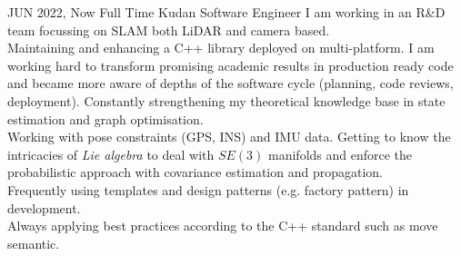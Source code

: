 \documentclass[
	12pt, %
]{../templates/FreemanCV}
\begin{document}
\jobentry
	{JUN 2022, Now} %
	{Full Time} %
  {Kudan} %
	{Software Engineer} %
	{
    I am working in an R\&D team focussing on SLAM both LiDAR and camera based.\\
    Maintaining and enhancing a C++ library deployed on multi-platform.
    I am working hard to transform promising academic results in production ready code
    and became more aware of depths of the software cycle (planning, code reviews, deployment).
    Constantly strengthening my theoretical knowledge base in state estimation and graph optimisation.\\
    Working with pose constraints (GPS, INS) and IMU data.
    Getting to know the intricacies of \textit{Lie algebra} to deal with \( SE(3) \) manifolds and enforce the
    probabilistic approach with covariance estimation and propagation.\\
    Frequently using templates and design patterns (e.g. factory pattern) in development.\\
    Always applying best practices according to the C++ standard such as move semantic.
  }
\end{document}
